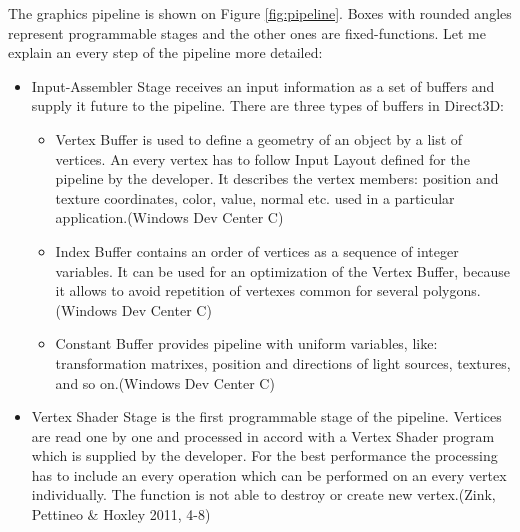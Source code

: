 \documentclass[twoside, english, 11pt]{report}
\begin{document}
The graphics pipeline is shown on Figure \ref{fig:pipeline}. Boxes with rounded angles represent programmable stages and the other ones are fixed-functions. Let me explain an every step of the pipeline more detailed:

\begin{itemize}
\item Input-Assembler Stage receives an input information as a set of buffers and supply it future to the pipeline. There are three types of buffers in Direct3D:
  \begin{itemize}
    \item Vertex Buffer is used to define a geometry of an object by a list of vertices. An every vertex has to follow Input Layout defined for the pipeline by the developer. It describes the vertex members: position and texture coordinates, color, value, normal etc. used in a particular application.(Windows Dev Center C)
    \item Index Buffer contains an order of vertices as a sequence of integer variables. It can be used for an optimization of the Vertex Buffer, because it allows to avoid repetition of vertexes common for several polygons.(Windows Dev Center C)
    \item Constant Buffer provides pipeline with uniform variables, like: transformation matrixes, position and directions of light sources, textures, and so on.(Windows Dev Center C)
  \end{itemize}
  
\item Vertex Shader Stage is the first programmable stage of the pipeline. Vertices are read one by one and processed in accord with a Vertex Shader program which is supplied by the developer. For the best performance the processing has to include an every operation which can be performed on an every vertex individually. The function is not able to destroy or create new vertex.(Zink, Pettineo \& Hoxley 2011, 4-8)


\end{itemize}
\end{document}
